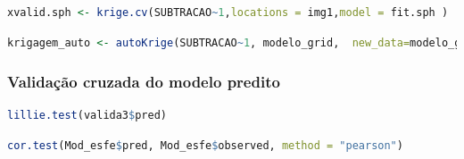  
  \lstset{
	language=R, %
	caption= Validação cruzada em linguagem R,} %
\begin{lstlisting}[language=R]
	xvalid.sph <- krige.cv(SUBTRACAO~1,locations = img1,model = fit.sph ) 
\end{lstlisting}  

  \lstset{
	language=R, %
	caption= Krigagem em linguagem R,} %
\begin{lstlisting}[language=R]
	krigagem_auto <- autoKrige(SUBTRACAO~1, modelo_grid,  new_data=modelo_grid, start_vals=c(variofit_geor$nugget, variofit_geor$cov.pars[2], variofit_geor$cov.pars[1]))
\end{lstlisting}  
 
\subsubsection{Validação cruzada do modelo predito }
 
  \lstset{
	language=R, %
	caption= Teste Lilliefors (Kolmogorov\_Smirnov)em linguagem R,} %
\begin{lstlisting}[language=R]
	lillie.test(valida3$pred)
\end{lstlisting}  
 
   \lstset{
 	language=R, %
 	caption= Teste de correlação em linguagem R,} %
 \begin{lstlisting}[language=R]
 	cor.test(Mod_esfe$pred, Mod_esfe$observed, method = "pearson")
 	 \end{lstlisting} 
 
